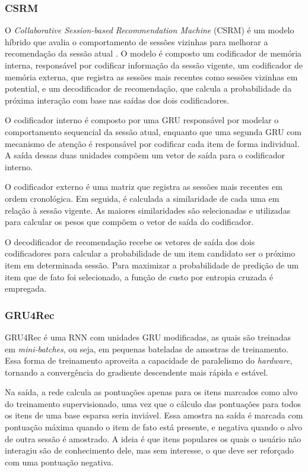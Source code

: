 \subsubsection{CSRM}
O \textit{Collaborative Session-based Recommendation Machine} (CSRM) é um modelo
híbrido que avalia o comportamento de sessões vizinhas para melhorar a
recomendação da sessão atual \cite{collaborative2018}. O modelo é composto um
codificador de memória interna, responsável por codificar informação da sessão
vigente, um codificador de memória externa, que registra as sessões mais
recentes como sessões vizinhas em potential, e um decodificador de recomendação,
que calcula a probabilidade da próxima interação com base nas saídas dos dois
codificadores.

O codificador interno é composto por uma GRU responsável por modelar
o comportamento sequencial da sessão atual, enquanto que uma segunda GRU com
mecanismo de atenção é responsável por codificar cada item de forma individual.
A saída dessas duas unidades compõem um vetor de saída para o codificador interno.

O codificador externo é uma matriz que registra as sessões mais recentes em
ordem cronológica. Em seguida, é calculada a similaridade de cada uma em relação
à sessão vigente. As maiores similaridades são selecionadas e utilizadas para
calcular os pesos que compõem o vetor de saída do codificador.

O decodificador de recomendação recebe os vetores de saída dos dois
codificadores para calcular a probabilidade de um item candidato ser o próximo
item em determinada sessão. Para maximizar a probabilidade de predição de um
item que de fato foi selecionado, a função de custo por entropia cruzada é
empregada.

\subsubsection{GRU4Rec}
GRU4Rec  \cite{gru4rec_1, gru4rec_2} é uma RNN com unidades GRU
modificadas, as quais são treinadas em \textit{mini-batches}, ou seja, em
pequenas bateladas de amostras de treinamento. Essa forma de treinamento
aproveita a capacidade de paralelismo do \textit{hardware}, tornando a
convergência do gradiente descendente mais rápida e estável.

Na saída, a rede calcula as pontuações apenas para os itens marcados como
alvo do treinamento supervisionado, uma vez que o cálculo das
pontuações para todos os itens de uma base esparsa seria inviável. Essa amostra
na saída é marcada com pontuação máxima quando o item de fato está presente, e
negativa quando o alvo de outra sessão é amostrado. A ideia é que itens
populares os quais o usuário não interagiu são de conhecimento dele, mas sem
interesse, o que deve ser reforçado com uma pontuação negativa.

